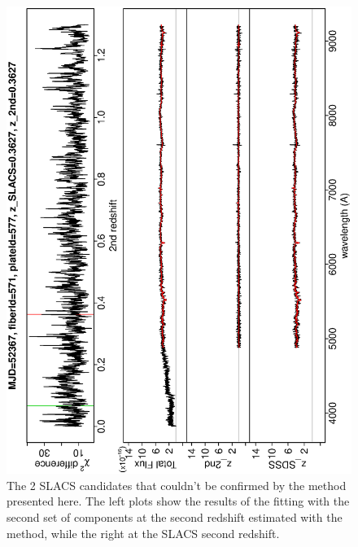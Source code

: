 \documentclass[12pt,preprint]{aastex}
\begin{document}
\begin{figure}
\includegraphics[angle=-90,width=0.49\columnwidth]{paper_plots/66ggSLACS}
\caption{The 2 SLACS candidates that couldn't be confirmed by the
  method presented here. The left plots show the results of the
  fitting with the second set of components at the second redshift
  estimated with the method, while the right at the SLACS second
  redshift.}
\label{fig:9}
\end{figure}
\end{document}
